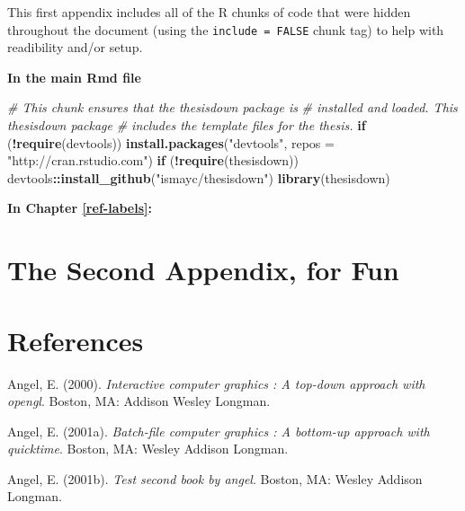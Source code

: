 \documentclass[12pt,twoside]{reedthesis}
\newenvironment{Shaded}{\begin{snugshade}}{\end{snugshade}}
\newcommand{\KeywordTok}[1]{\textcolor[rgb]{0.13,0.29,0.53}{\textbf{#1}}}
\newcommand{\DataTypeTok}[1]{\textcolor[rgb]{0.13,0.29,0.53}{#1}}
\newcommand{\StringTok}[1]{\textcolor[rgb]{0.31,0.60,0.02}{#1}}
\newcommand{\CommentTok}[1]{\textcolor[rgb]{0.56,0.35,0.01}{\textit{#1}}}
\newcommand{\ControlFlowTok}[1]{\textcolor[rgb]{0.13,0.29,0.53}{\textbf{#1}}}
\newcommand{\OperatorTok}[1]{\textcolor[rgb]{0.81,0.36,0.00}{\textbf{#1}}}
\newcommand{\NormalTok}[1]{#1}
\theoremstyle{definition}
\theoremstyle{definition}
\theoremstyle{definition}
\theoremstyle{remark}
\begin{document}
This first appendix includes all of the R chunks of code that were
hidden throughout the document (using the \texttt{include\ =\ FALSE}
chunk tag) to help with readibility and/or setup.

\textbf{In the main Rmd file}
\begin{Shaded}
\begin{Highlighting}[]
\CommentTok{# This chunk ensures that the thesisdown package is}
\CommentTok{# installed and loaded. This thesisdown package}
\CommentTok{# includes the template files for the thesis.}
\ControlFlowTok{if}\NormalTok{ (}\OperatorTok{!}\KeywordTok{require}\NormalTok{(devtools)) }\KeywordTok{install.packages}\NormalTok{(}\StringTok{"devtools"}\NormalTok{, }
    \DataTypeTok{repos =} \StringTok{"http://cran.rstudio.com"}\NormalTok{)}
\ControlFlowTok{if}\NormalTok{ (}\OperatorTok{!}\KeywordTok{require}\NormalTok{(thesisdown)) devtools}\OperatorTok{::}\KeywordTok{install_github}\NormalTok{(}\StringTok{"ismayc/thesisdown"}\NormalTok{)}
\KeywordTok{library}\NormalTok{(thesisdown)}
\end{Highlighting}
\end{Shaded}
\textbf{In Chapter \ref{ref-labels}:}

\chapter{The Second Appendix, for
Fun}\label{the-second-appendix-for-fun}

\backmatter

\chapter*{References}\label{references}


\noindent

\setlength{\parindent}{-0.20in} \setlength{\leftskip}{0.20in}
\setlength{\parskip}{8pt}

\hypertarget{refs}{}
\hypertarget{ref-angel2000}{}
Angel, E. (2000). \emph{Interactive computer graphics : A top-down
approach with opengl}. Boston, MA: Addison Wesley Longman.

\hypertarget{ref-angel2001}{}
Angel, E. (2001a). \emph{Batch-file computer graphics : A bottom-up
approach with quicktime}. Boston, MA: Wesley Addison Longman.

\hypertarget{ref-angel2002a}{}
Angel, E. (2001b). \emph{Test second book by angel}. Boston, MA: Wesley
Addison Longman.


\end{document}
